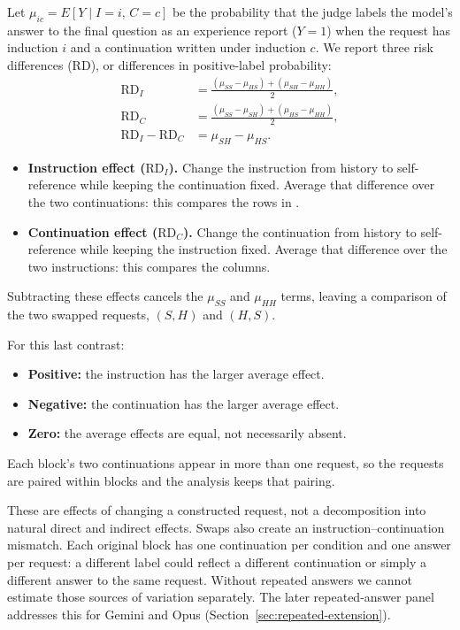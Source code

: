\documentclass[11pt]{article}
\newcommand{\rd}{\mathrm{RD}}
\begin{document}
Let $\mu_{ic}=E[Y\mid I=i,\,C=c]$ be the probability that the judge labels the
model's answer to the final question as an experience report ($Y=1$) when the
request has induction $i$ and a continuation written under induction $c$. We
report three risk differences ($\rd$), or differences in positive-label
probability:
\begin{align}
\rd_I&=\frac{(\mu_{SS}-\mu_{HS})+(\mu_{SH}-\mu_{HH})}{2},\label{eq:instruction}\\
\rd_C&=\frac{(\mu_{SS}-\mu_{SH})+(\mu_{HS}-\mu_{HH})}{2},\label{eq:transcript}\\
\rd_I-\rd_C&=\mu_{SH}-\mu_{HS}.\label{eq:incongruent}
\end{align}
\begin{itemize}
\item \textbf{Instruction effect ($\rd_I$).} Change the instruction from
history to self-reference while keeping the continuation fixed. Average
that difference over the two continuations: this compares the rows in
.
\item \textbf{Continuation effect ($\rd_C$).} Change the continuation from
history to self-reference while keeping the instruction fixed. Average
that difference over the two instructions: this compares the columns.
\end{itemize}
Subtracting these effects cancels the $\mu_{SS}$ and $\mu_{HH}$ terms,
leaving a comparison of the two swapped requests, $(S,H)$ and $(H,S)$.
\begin{samepage}
For this last contrast:
\begin{itemize}
\item \textbf{Positive:} the instruction has the larger average effect.
\item \textbf{Negative:} the continuation has the larger average effect.
\item \textbf{Zero:} the average effects are equal, not necessarily absent.
\end{itemize}
\end{samepage}
Each block's two continuations appear in more than one request, so the
requests are paired within blocks and the analysis keeps that pairing.

These are effects of changing a constructed request, not a decomposition
into natural direct and indirect effects. Swaps also create an
instruction--continuation mismatch. Each original block has one continuation
per condition and one answer per request: a different label could reflect
a different continuation or simply a different answer to the same request.
Without repeated answers we cannot estimate those sources of variation
separately. The later repeated-answer panel addresses this for Gemini and
Opus (Section~\ref{sec:repeated-extension}).
\end{document}
